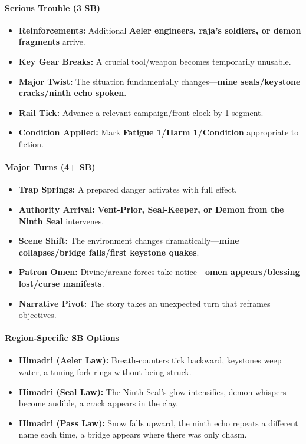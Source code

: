 \paragraph{Serious Trouble (3 SB)}
\begin{itemize}
\item \textbf{Reinforcements:} Additional \textbf{Aeler engineers, raja's soldiers, or demon fragments} arrive.
\item \textbf{Key Gear Breaks:} A crucial tool/weapon becomes temporarily unusable.
\item \textbf{Major Twist:} The situation fundamentally changes—\textbf{mine seals/keystone cracks/ninth echo spoken}.
\item \textbf{Rail Tick:} Advance a relevant campaign/front clock by 1 segment.
\item \textbf{Condition Applied:} Mark \textbf{Fatigue 1/Harm 1/Condition} appropriate to fiction.
\end{itemize}

\paragraph{Major Turns (4+ SB)}
\begin{itemize}
\item \textbf{Trap Springs:} A prepared danger activates with full effect.
\item \textbf{Authority Arrival:} \textbf{Vent-Prior, Seal-Keeper, or Demon from the Ninth Seal} intervenes.
\item \textbf{Scene Shift:} The environment changes dramatically—\textbf{mine collapses/bridge falls/first keystone quakes}.
\item \textbf{Patron Omen:} Divine/arcane forces take notice—\textbf{omen appears/blessing lost/curse manifests}.
\item \textbf{Narrative Pivot:} The story takes an unexpected turn that reframes objectives.
\end{itemize}

\paragraph{Region-Specific SB Options}
\begin{itemize}
\item \textbf{Himadri (Aeler Law):} Breath-counters tick backward, keystones weep water, a tuning fork rings without being struck.
\item \textbf{Himadri (Seal Law):} The Ninth Seal's glow intensifies, demon whispers become audible, a crack appears in the clay.
\item \textbf{Himadri (Pass Law):} Snow falls upward, the ninth echo repeats a different name each time, a bridge appears where there was only chasm.
\end{itemize}

